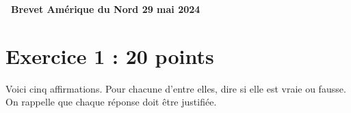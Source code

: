 \documentclass[11pt]{article}
\begin{document}
\setlength\parindent{0mm}
\pagestyle{fancy}
\thispagestyle{empty}
\begin{center} {\huge \textbf{\decofourleft~Brevet Amérique du Nord 29 mai 2024 \decofourright}}
\end{center}

\bigskip

\section*{Exercice 1 : \hfill 20 points}
Voici cinq affirmations. Pour chacune d'entre elles, dire si elle est vraie ou fausse. On rappelle que chaque réponse doit être justifiée.
\end{document}
